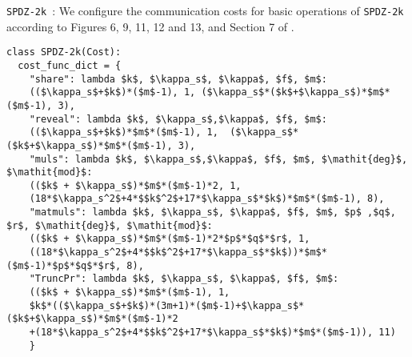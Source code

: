  
\texttt{SPDZ-2k}~\cite{spdz2k}: We configure the communication costs for basic operations of \texttt{SPDZ-2k}~\cite{spdz2k} according to Figures 6, 9, 11, 12 and 13, and Section 7 of \cite{spdz2k}. 


\begin{lstlisting}[mathescape,xleftmargin=2em,framexleftmargin=2em, caption = {Communication cost configuration for basic operations of \texttt{SPDZ-2k}~\cite{spdz2k}.}, columns=fullflexible, label = {list:spdz_cost}]
class SPDZ-2k(Cost):
  cost_func_dict = {
    "share": lambda $k$, $\kappa_s$, $\kappa$, $f$, $m$: 
    (($\kappa_s$+$k$)*($m$-1), 1, ($\kappa_s$*($k$+$\kappa_s$)*$m$*($m$-1), 3),
    "reveal": lambda $k$, $\kappa_s$,$\kappa$, $f$, $m$:
    (($\kappa_s$+$k$)*$m$*($m$-1), 1,  ($\kappa_s$*($k$+$\kappa_s$)*$m$*($m$-1), 3),
    "muls": lambda $k$, $\kappa_s$,$\kappa$, $f$, $m$, $\mathit{deg}$, $\mathit{mod}$: 
    (($k$ + $\kappa_s$)*$m$*($m$-1)*2, 1, 
    (18*$\kappa_s^2$+4*$$k$^2$+17*$\kappa_s$*$k$)*$m$*($m$-1), 8),
    "matmuls": lambda $k$, $\kappa_s$, $\kappa$, $f$, $m$, $p$ ,$q$, $r$, $\mathit{deg}$, $\mathit{mod}$: 
    (($k$ + $\kappa_s$)*$m$*($m$-1)*2*$p$*$q$*$r$, 1,
    ((18*$\kappa_s^2$+4*$$k$^2$+17*$\kappa_s$*$k$))*$m$*($m$-1)*$p$*$q$*$r$, 8),
    "TruncPr": lambda $k$, $\kappa_s$, $\kappa$, $f$, $m$:
    (($k$ + $\kappa_s$)*$m$*($m$-1), 1, 
    $k$*(($\kappa_s$+$k$)*(3m+1)*($m$-1)+$\kappa_s$*($k$+$\kappa_s$)*$m$*($m$-1)*2
    +(18*$\kappa_s^2$+4*$$k$^2$+17*$\kappa_s$*$k$)*$m$*($m$-1)), 11) 
    }
\end{lstlisting}


